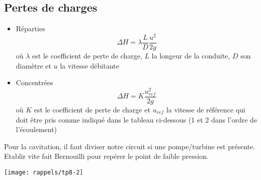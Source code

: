 \subsection*{Pertes de charges}
\begin{itemize}
	\item Réparties
	\begin{equation}
		\Delta H = \lambda \frac{L}{D}\frac{u^2}{2g}
	\end{equation}
	où $\lambda$ est le coefficient de perte de charge, $L$ la longeur de la conduite, $D$ son diamètre et $u$ la vitesse débitante
	
	\item Concentrées
	\begin{equation}
		\Delta H = K \frac{u^2_{ref}}{2g}
	\end{equation}
	où $K$ est le coefficient de perte de charge et $u_{ref}$ la vitesse de référence qui doit être pris comme indiqué dans le tableau ci-dessous (1 et 2 dans l'ordre de l'écoulement)
\end{itemize}	
Pour la cavitation, il faut diviser notre circuit si une pompe/turbine est présente. Etablir vite fait Bernouilli pour repérer le point de faible pression. \\

	\begin{center}
	\texttt{[image: rappels/tp8-2]}
	\end{center}
